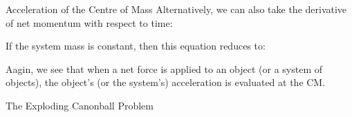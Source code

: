 \documentclass[12pt,compress,aspectratio=169]{beamer}
\begin{document}
\begin{frame}{Acceleration of the Centre of Mass}
  Alternatively, we can also take the derivative of net momentum with respect
  to time:%
  

  If the system mass is constant, then this equation reduces to:

  
  Aagin, we see that when a net force is applied to an object (or a system of
  objects), the object's (or the system's) acceleration is evaluated at the CM.
  \vspace{.3in}
\end{frame}



\begin{frame}[b]{The Exploding Canonball Problem}
\end{frame}


\end{document}
